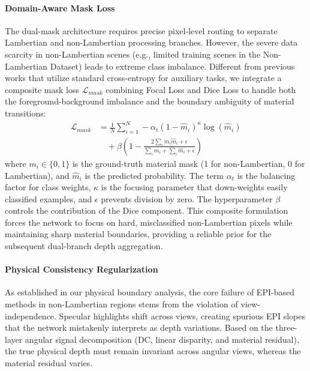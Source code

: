 \documentclass[lettersize,journal]{IEEEtran}
\begin{document}
\paragraph{Domain-Aware Mask Loss}

The dual-mask architecture requires precise pixel-level routing to separate Lambertian and non-Lambertian processing branches. However, the severe data scarcity in non-Lambertian scenes (e.g., limited training scenes in the Non-Lambertian Dataset) leads to extreme class imbalance. Different from previous works that utilize standard cross-entropy for auxiliary tasks, we integrate a composite mask loss $\mathcal{L}_{mask}$ combining Focal Loss and Dice Loss to handle both the foreground-background imbalance and the boundary ambiguity of material transitions:
\begin{equation}
\begin{aligned}
\mathcal{L}_{mask} &= \frac{1}{N} \sum_{i=1}^{N} - \alpha_t (1 - \hat{m}_i)^{\kappa} \log(\hat{m}_i) \\
&\quad + \beta \left( 1 - \frac{2 \sum_{i} m_i \hat{m}_i + \epsilon}{\sum_{i} m_i + \sum_{i} \hat{m}_i + \epsilon} \right)
\end{aligned}
\end{equation}
where $m_i \in \{0, 1\}$ is the ground-truth material mask (1 for non-Lambertian, 0 for Lambertian), and $\hat{m}_i$ is the predicted probability. The term $\alpha_t$ is the balancing factor for class weights, $\kappa$ is the focusing parameter that down-weights easily classified examples, and $\epsilon$ prevents division by zero. The hyperparameter $\beta$ controls the contribution of the Dice component. This composite formulation forces the network to focus on hard, misclassified non-Lambertian pixels while maintaining sharp material boundaries, providing a reliable prior for the subsequent dual-branch depth aggregation.

\paragraph{Physical Consistency Regularization}

As established in our physical boundary analysis, the core failure of EPI-based methods in non-Lambertian regions stems from the violation of view-independence. Specular highlights shift across views, creating spurious EPI slopes that the network mistakenly interprets as depth variations. Based on the three-layer angular signal decomposition (DC, linear disparity, and material residual), the true physical depth must remain invariant across angular views, whereas the material residual varies. 
\end{document}
